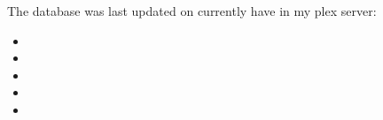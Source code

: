 The database was last updated on %
currently have in my plex server:
\begin{itemize}
  \item %
    
  \item %
    
  \item %

  \item %
    
  \item %
\end{itemize}